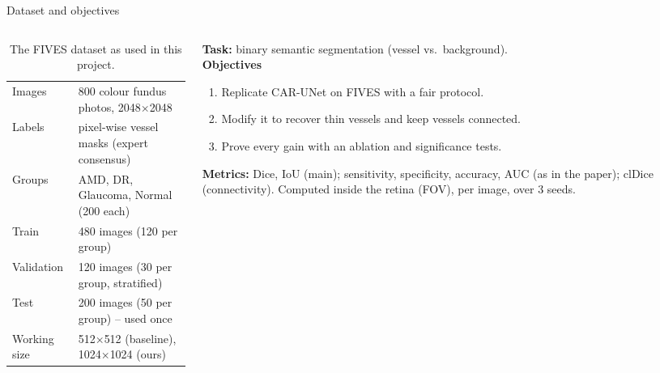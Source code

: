 \documentclass[aspectratio=169,10pt]{beamer}
\begin{document}
\begin{frame}{Dataset and objectives}
  \begin{columns}[T]
    \begin{column}{0.52\textwidth}
      \begin{table}
        \caption{The FIVES dataset \cite{jin2022fives} as used in this project.}
        \footnotesize
        \begin{tabular}{@{}ll@{}}
          \toprule
          Images & 800 colour fundus photos, 2048$\times$2048 \\
          Labels & pixel-wise vessel masks (expert consensus) \\
          Groups & AMD, DR, Glaucoma, Normal (200 each) \\
          Train & 480 images (120 per group) \\
          Validation & 120 images (30 per group, stratified) \\
          Test & 200 images (50 per group) -- used once \\
          Working size & 512$\times$512 (baseline), 1024$\times$1024 (ours) \\
          \bottomrule
        \end{tabular}
      \end{table}
    \end{column}
    \begin{column}{0.46\textwidth}
      \textbf{Task:} binary semantic segmentation (vessel vs.\ background).\\[4pt]
      \textbf{Objectives}
      \begin{enumerate}\setlength\itemsep{2pt}
        \item Replicate CAR-UNet \cite{guo2021carunet} on FIVES with a fair protocol.
        \item Modify it to recover thin vessels and keep vessels connected.
        \item Prove every gain with an ablation and significance tests.
      \end{enumerate}
      \textbf{Metrics:} Dice, IoU (main); sensitivity, specificity, accuracy, AUC (as in the paper); clDice (connectivity). Computed inside the retina (FOV), per image, over 3 seeds.
    \end{column}
  \end{columns}
\end{frame}

\end{document}
